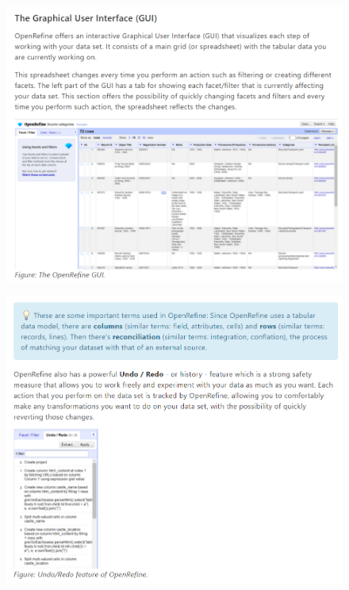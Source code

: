 \begin{figure}[H]
    \includegraphics[width=\linewidth]{./Figures/Appendices/worksheet/6.png}
\end{figure}
\begin{figure}[H]
    \includegraphics[width=\linewidth]{./Figures/Appendices/worksheet/7.png}
\end{figure}
